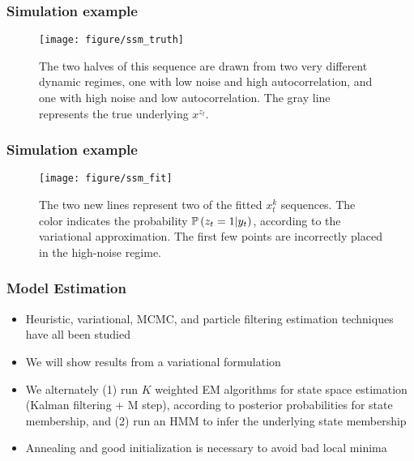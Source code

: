\documentclass{beamer}
\begin{document}
\begin{frame}
  \frametitle{Simulation example}
\begin{figure}[ht]
  \centering
  \texttt{[image: figure/ssm\_truth]}
  \caption{The two halves of this sequence are drawn from two very different
    dynamic regimes, one with low noise and high autocorrelation, and one with
    high noise and low autocorrelation. The gray line represents the true
    underlying $x^{z_{t}}$. \label{fig:ssm_truth} }
\end{figure}
  
\end{frame}

\begin{frame}
  \frametitle{Simulation example}
\begin{figure}[ht]
  \centering
  \texttt{[image: figure/ssm\_fit]}
  \caption{The two new lines represent two of the fitted $x_{t}^{k}$ sequences.
    The color indicates the probability $\mathbb{P}\left({z_{t} = 1 \vert y_{t}}\right)$,
      according to the variational approximation. The first few points are
      incorrectly placed in the high-noise regime.\label{fig:ssm_truth} }
\end{figure}
\end{frame}

\begin{frame}
  \frametitle{Model Estimation}
  \begin{itemize}
  \item Heuristic, variational, MCMC, and particle filtering estimation
    techniques have all been studied \citep{harrison1976bayesian, ghahramani2000variational, fruhwirth2001markov, doucet2001particle}
  \item We will show results from a variational formulation
  \item We alternately (1) run $K$ weighted EM algorithms for state space
    estimation (Kalman filtering + M step), according to posterior probabilities
    for state membership, and (2) run an HMM to infer the underlying state
    membership
  \item Annealing and good initialization is necessary to avoid bad local minima
  \end{itemize}
\end{frame}
\end{document}
